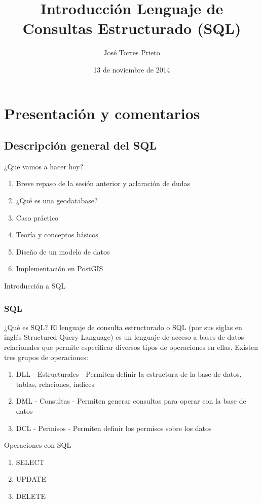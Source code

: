 \documentclass{classes/beamer_GeomaticaUA}
\author{José Torres Prieto}
\title{Introducción Lenguaje de Consultas Estructurado (SQL)}
\institute[GeomaticaLab]{Instituto Interuniversitario de Geografía\\Laboratorio de Geomática}
\date{13 de noviembre de 2014}
\begin{document}
\begin{frame}
\titlepage
\end{frame}

\section[Introducción]{Presentación y comentarios}
\subsection{Descripción general del SQL}
\begin{frame}{¿Que vamos a hacer hoy?}
\begin{enumerate}
\item Breve repaso de la sesión anterior y aclaración de dudas
\item ¿Qué es una geodatabase?
\item Caso práctico
\item Teoría y conceptos básicos
\item Diseño de un modelo de datos
\item Implementación en PostGIS
\end{enumerate}
\end{frame}

\begin{frame}{Introducción a SQL}
\frametitle{SQL}
\begin{block}{¿Qué es SQL?}
El lenguaje de consulta estructurado o SQL (por sus siglas en inglés Structured Query Language) es un lenguaje de acceso a bases de datos relacionales que permite especificar diversos tipos de operaciones en ellas.
Existen tres grupos de operaciones:
\begin{enumerate}
\item DLL - Estructurales - Permiten definir la estructura de la base de datos, tablas, relaciones, índices
\item DML - Consultas - Permiten generar consultas para operar con la base de datos 
\item DCL - Permisos - Permiten definir los permisos sobre los datos
\end{enumerate}

\end{block}
\end{frame}


\begin{frame}{Operaciones con SQL}
\begin{enumerate}
\item SELECT 
\item UPDATE
\item DELETE
\end{enumerate}
\end{frame}
\end{document}
